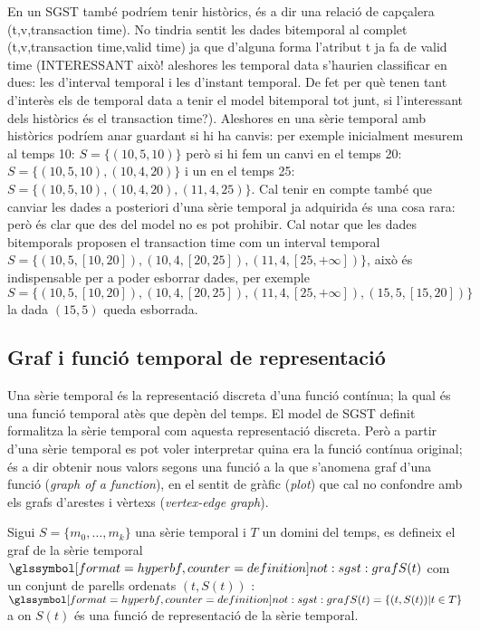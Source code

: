  En un SGST
també podríem tenir històrics, és a dir una relació de capçalera
(t,v,transaction time). No tindria sentit les dades bitemporal al
complet (t,v,transaction time,valid time) ja que d'alguna forma
l'atribut t ja fa de valid time (INTERESSANT això! aleshores les
temporal data s'haurien classificar en dues: les d'interval temporal i
les d'instant temporal. De fet per què tenen tant d'interès els de
temporal data a tenir el model bitemporal tot junt, si l'interessant
dels històrics és el transaction time?).  Aleshores en una sèrie
temporal amb històrics podríem anar guardant si hi ha canvis: per
exemple inicialment mesurem al temps 10: $S=\{(10,5,10)\}$ però si hi
fem un canvi en el temps 20: $S=\{(10,5,10),(10,4,20)\}$ i un en el
temps 25: $S=\{(10,5,10),(10,4,20),(11,4,25)\}$. Cal tenir en compte
també que canviar les dades a posteriori d'una sèrie temporal ja
adquirida és una cosa rara: però és clar que des del model no es pot
prohibir. Cal notar que les dades bitemporals proposen el transaction
time com un interval temporal
$S=\{(10,5,[10,20]),(10,4,[20,25]),(11,4,[25,+\infty])\}$, això és
indispensable per a poder esborrar dades, per exemple
$S=\{(10,5,[10,20]),(10,4,[20,25]),(11,4,[25,+\infty]),(15,5,[15,20])\}$
la dada $(15,5)$ queda esborrada.





\subsection{Graf i funció temporal de representació}
\label{sec:model:repr}

Una sèrie temporal és la representació discreta d'una funció contínua;
la qual és una funció temporal atès que depèn del temps. El model de
SGST definit formalitza la sèrie temporal com aquesta
representació discreta. Però a partir d'una sèrie temporal es pot
voler interpretar quina era la funció contínua original; és a dir
obtenir nous valors segons una funció a la que s'anomena graf d'una
funció (\emph{graph of a function}), en el sentit de gràfic
(\emph{plot}) que cal no confondre amb els grafs d'arestes i vèrtexs
(\emph{vertex-edge graph}).

\begin{definition}%
  Sigui $S=\{m_0,\ldots,m_k\}$ una sèrie temporal i $T$ un domini del
  temps, es defineix el graf de la sèrie temporal
  $\glssymboldef{not:sgst:graf} S(t)$ com un conjunt de parells
  ordenats $(t,S(t))$ : $\glssymboldef{not:sgst:graf} S(t) = \{ (t,S(t)) |
  t\in T \}$ a on $S(t)$ és una funció de representació de la sèrie
  temporal.
\end{definition}

